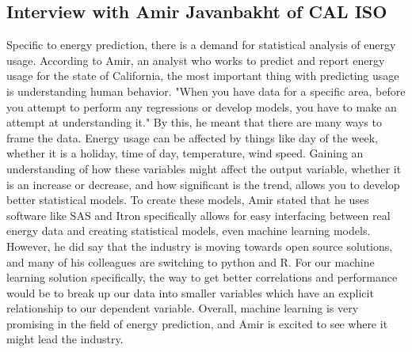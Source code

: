 \documentclass[10pt]{article}
\begin{document}
\subsection*{Interview with Amir Javanbakht of CAL ISO}
Specific to energy prediction, there is a demand for statistical analysis of energy usage. According to Amir, an analyst who works to predict and report energy usage for the state of California, the most important thing with predicting usage is understanding human behavior. "When you have data for a specific area, before you attempt to perform any regressions or develop models, you have to make an attempt at understanding it." By this, he meant that there are many ways to frame the data. Energy usage can be affected by things like day of the week, whether it is a holiday, time of day, temperature, wind speed. Gaining an understanding of how these variables might affect the output variable, whether it is an increase or decrease, and how significant is the trend, allows you to develop better statistical models. To create these models, Amir stated that he uses software like SAS and Itron specifically allows for easy interfacing between real energy data and creating statistical models, even machine learning models. However, he did say that the industry is moving towards open source solutions, and many of his colleagues are switching to python and R. For our machine learning solution specifically, the way to get better correlations and performance would be to break up our data into smaller variables which have an explicit relationship to our dependent variable. Overall, machine learning is very promising in the field of energy prediction, and Amir is excited to see where it might lead the industry.
\end{document}
